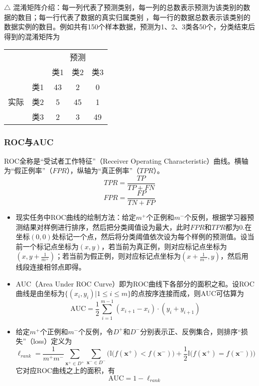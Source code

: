 \documentclass{ctexart}
\begin{document}
						\begin{framed}
							$\triangle$ 混淆矩阵介绍：每一列代表了预测类别，每一列的总数表示预测为该类别的数据的数目；每一行代表了数据的真实归属类别 ，每一行的数据总数表示该类别的数据实例的数目。例如共有150个样本数据，预测为1、2、3类各50个，分类结束后得到的混淆矩阵为\begin{center}
								\begin{tabular}{|c|c|c|c|c|}
									\hline
									\multicolumn{2}{|c|}{\multirow{2}{*}{}} & \multicolumn{3}{c|}{预测} \\ \cline{3-5} 
									\multicolumn{2}{|c|}{}                  & 类1     & 类2     & 类3    \\ \hline
									\multirow{3}{*}{实际}         & 类1        & 43     & 2      & 0     \\ \cline{2-5} 
									& 类2        & 5      & 45     & 1     \\ \cline{2-5} 
									& 类3        & 2      & 3      & 49    \\ \hline
								\end{tabular}
							\end{center}
						\end{framed}
					\subsubsection{ROC与AUC}
					
						ROC全称是``受试者工作特征''（Receiver Operating Characteristic）曲线。横轴为``假正例率''（$FPR$），纵轴为``真正例率''（$TPR$）。\[TPR=\frac{TP}{TP+FN}\]\[FPR=\frac{FP}{TN+FP}\]
						\begin{itemize}
							\item 现实任务中ROC曲线的绘制方法：给定$m^+$个正例和$m^-$个反例，根据学习器预测结果对样例进行排序，然后把分类阈值设为最大，此时$FPR$和$TPR$都为0.在坐标$(0, 0)$处标记一个点，然后将分类阈值依次设为每个样例的预测值。设当前一个标记点坐标为$(x,y)$，若当前为真正例，则对应标记点坐标为$(x,y+\frac{1}{m^+})$；若当前为假正例，则对应标记点坐标为$(x+\frac{1}{m^-},y)$，然后用线段连接相邻点即得。
							\item AUC（Area Under ROC Curve）即为ROC曲线下各部分的面积之和。设ROC曲线是由坐标为$\{(x_i,y_i)|1\le i\le m\}$的点按序连接而成，则AUC可估算为\[\mathrm{AUC}=\frac{1}{2}\sum_{i=1}^{m-1}(x_{i+1}-x_i)\cdot(y_i+y_{i+1})\]
							\item 给定$m^+$个正例和$m^-$个反例，令$D^+$和$D^-$分别表示正、反例集合，则排序``损失''（loss）定义为\[\ell_{rank}=\frac{1}{m^+m^-}\sum_{\bm{x}^+\in D^+}^{}\sum_{\bm{x}^-\in D^-}^{}\bigg(\mathbb{I}\big(f(\bm{x}^+)<f(\bm{x}^-)\big)+\frac{1}{2}\mathbb{I}\big(f(\bm{x}^+)=f(\bm{x}^-)\big)\bigg)\]它对应ROC曲线之上的面积，有\[\mathrm{AUC}=1-\ell_{rank}\]
						\end{itemize}
\end{document}
